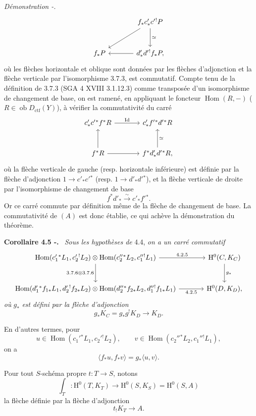 \documentclass[11pt]{article}
\newenvironment{statement}[1]{\par\medskip\noindent\textbf{#1.}\ }{\par\medskip}
\newenvironment{prooftext}[1][Proof]{\par\noindent\emph{#1.}\ }{\par\medskip}
\renewcommand{\H}{\mathrm{H}}
\DeclareMathOperator{\Hom}{Hom}
\newcommand{\ob}{\operatorname{ob}}
\providecommand{\Dctf}{D_{\mathrm{ctf}}}
\providecommand{\Id}{\mathrm{Id}}
\providecommand{\lisom}{\xrightarrow{\sim}}
\providecommand{\Dctf}{D_{\mathrm{ctf}}}
\providecommand{\Hom}{\operatorname{Hom}}
\providecommand{\ob}{\operatorname{ob}}
\providecommand{\Hom}{\operatorname{Hom}}
\begin{document}
\begin{prooftext}[Démonstration -]
\[\begin{tikzcd}[column sep=large,row sep=large]
& f_*c'_*c'{}^!P \arrow[d,"\simeq"]\arrow[dl]\\
f_*P & d'_*d'{}^!f_*P,\arrow[l]
\end{tikzcd}
\]
où les flèches horizontale et oblique sont données par les flèches d'adjonction et la flèche verticale par l'isomorphisme 3.7.3, est commutatif. Compte tenu de la définition de 3.7.3 (SGA 4 XVIII 3.1.12.3) comme transposée d'un isomorphisme de changement de base, on est ramené, en appliquant le foncteur $\Hom(R,-)$ ($R\in\ob\Dctf(Y)$), à vérifier la commutativité du carré
\[
\begin{tikzcd}[column sep=large,row sep=large]
c'_*c'{}^*f^*R \arrow[r,"\Id"] &
c'_*f'{}^*d'{}^*R\\
f^*R \arrow[u] \arrow[r] &
f^*d'_*d'{}^*R,\arrow[u,"\simeq"']
\end{tikzcd}
\]
où la flèche verticale de gauche (resp. horizontale inférieure) est définie par la flèche d'adjonction $1\longrightarrow c'_*c'{}^*$ (resp. $1\longrightarrow d'_*d'{}^*$), et la flèche verticale de droite par l'isomorphisme de changement de base
\[
f^*d'_*\lisom c'_*f'{}^*.
\]
Or ce carré commute par définition même de la flèche de changement de base. La commutativité de $(A)$ est donc établie, ce qui achève la démonstration du théorème.
\end{prooftext}

\begin{statement}{Corollaire 4.5 -}
\emph{Sous les hypothèses de} 4.4, \emph{on a un carré commutatif}
\[
\begin{tikzcd}[column sep=large,row sep=large]
\Hom(c_1'{}^*L_1,c_2'{}^!L_2)\otimes
\Hom(c_2''{}^*L_2,c_1''{}^!L_1)
 \arrow[r,"4.2.5"] \arrow[d,"3.7.6\otimes 3.7.6"'] &
\H^0(C,K_C)\arrow[d,"g_*"]\\
\Hom(d_1'{}^*f_{1*}L_1,d_2'{}^!f_{2*}L_2)\otimes
\Hom(d_2''{}^*f_{2*}L_2,d_1''{}^!f_{1*}L_1)
 \arrow[r,"4.2.5"'] &
\H^0(D,K_D),
\end{tikzcd}
\]
\emph{où} $g_*$ \emph{est défini par la flèche d'adjonction}
\[
g_*K_C=g_*g^!K_D\longrightarrow K_D.
\]

En d'autres termes, pour
\[
u\in\Hom(c_1'{}^*L_1,c_2'{}^!L_2),\qquad
v\in\Hom(c_2''{}^*L_2,c_1''{}^!L_1),
\]
on a
\begin{equation}
\tag{4.5.1}
\langle f_*u,f_*v\rangle=g_*\langle u,v\rangle.
\end{equation}
\end{statement}

Pour tout $S$-schéma propre $t:T\longrightarrow S$, notons
\begin{equation}
\tag{4.6}
\int_T:\H^0(T,K_T)\longrightarrow \H^0(S,K_S)=\H^0(S,A)
\end{equation}
la flèche définie par la flèche d'adjonction
\[
t_!K_T\longrightarrow A.
\]
\end{document}
